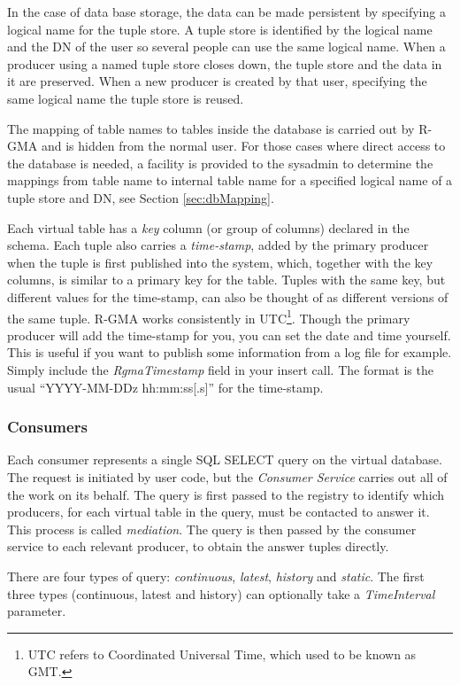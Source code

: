 In the case of data base storage, the data can be made persistent by
specifying a logical name for the tuple store. A tuple store is
identified by the logical name and the DN of the user so several
people can use the same logical name. When a producer using a named
tuple store closes down, the tuple store and the data in it are
preserved. When a new producer is created by that user, specifying the
same logical name the tuple store is reused.

The mapping of table names to tables inside the database is carried
out by R{}-GMA and is hidden from the normal user. For those cases
where direct access to the database is needed, a facility is provided
to the sysadmin to determine the mappings from table name to internal
table name for a specified logical name of a tuple store and DN, see
Section \ref{sec:dbMapping}.

Each virtual table has a \emph{key} column (or group of columns)
declared in the schema. Each tuple also carries a \emph{time-stamp},
added by the primary producer when the tuple is first published into
the system, which, together with the key columns, is similar to a
primary key for the table. Tuples with the same key, but different
values for the time-stamp, can also be thought of as different
versions of the same tuple. R-GMA works consistently in
UTC\footnote{UTC refers to Coordinated Universal Time, which used to
  be known as GMT.}. Though the primary producer will add the
time-stamp for you, you can set the date and time yourself. This is
useful if you want to publish some information from a log file for
example. Simply include the \emph{RgmaTimestamp} field in your insert
call. The format is the usual ``YYYY-MM-DDz hh:mm:ss[.s]'' for the
time-stamp.

\subsubsection{Consumers}
\label{sec:consumers}
Each consumer represents a single SQL SELECT query on the virtual
database. The request is initiated by user code, but the
\emph{Consumer Service} carries out all of the work on its behalf. The
query is first passed to the registry to identify which producers, for
each virtual table in the query, must be contacted to answer it. This
process is called \emph{mediation}. The query is then passed by the
consumer service to each relevant producer, to obtain the answer
tuples directly.

There are four types of query: \emph{continuous}, \emph{latest},
\emph{history} and \emph{static}.  The first three types (continuous,
latest and history) can optionally take a \emph{TimeInterval}
parameter.

